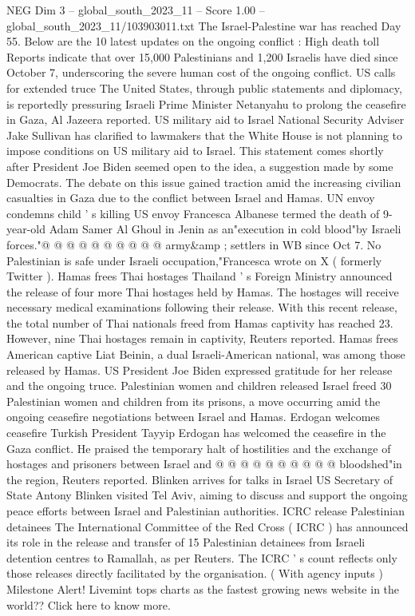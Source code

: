 \begin{textsample}{NEG Dim 3 – global\_south\_2023\_11 – Score 1.00 – global\_south\_2023\_11/103903011.txt}  \label{ex:f3_neg_083}
The Israel-Palestine war has reached Day 55.
Below are the 10 latest updates on the ongoing conflict : High death toll Reports indicate that over 15,000 Palestinians and 1,200 Israelis have died since October 7, underscoring the severe human cost of the ongoing conflict.
US calls for extended truce The United States, through public statements and diplomacy, is reportedly pressuring Israeli Prime Minister Netanyahu to prolong the ceasefire in Gaza, Al Jazeera reported.
US military aid to Israel National Security Adviser Jake Sullivan has clarified to lawmakers that the White House is not planning to impose conditions on US military aid to Israel.
This statement comes shortly after President Joe Biden seemed open to the idea, a suggestion made by some Democrats.
The debate on this issue gained traction amid the increasing civilian casualties in Gaza due to the conflict between Israel and Hamas.
UN envoy condemns child ' s killing US envoy Francesca Albanese termed the death of 9-year-old Adam Samer Al Ghoul in Jenin as an"execution in cold blood"by Israeli forces."@ @ @ @ @ @ @ @ @ @ army\&amp ; settlers in WB since Oct 7.
No Palestinian is safe under Israeli occupation,"Francesca wrote on X ( formerly Twitter ).
Hamas frees Thai hostages Thailand ' s Foreign Ministry announced the release of four more Thai hostages held by Hamas.
The hostages will receive necessary medical examinations following their release.
With this recent release, the total number of Thai nationals freed from Hamas captivity has reached 23.
However, nine Thai hostages remain in captivity, Reuters reported.
Hamas frees American captive Liat Beinin, a dual Israeli-American national, was among those released by Hamas.
US President Joe Biden expressed gratitude for her release and the ongoing truce.
Palestinian women and children released Israel freed 30 Palestinian women and children from its prisons, a move occurring amid the ongoing ceasefire negotiations between Israel and Hamas.
Erdogan welcomes ceasefire Turkish President Tayyip Erdogan has welcomed the ceasefire in the Gaza conflict.
He praised the temporary halt of hostilities and the exchange of hostages and prisoners between Israel and @ @ @ @ @ @ @ @ @ @ bloodshed"in the region, Reuters reported.
Blinken arrives for talks in Israel US Secretary of State Antony Blinken visited Tel Aviv, aiming to discuss and support the ongoing peace efforts between Israel and Palestinian authorities.
ICRC release Palestinian detainees The International Committee of the Red Cross ( ICRC ) has announced its role in the release and transfer of 15 Palestinian detainees from Israeli detention centres to Ramallah, as per Reuters.
The ICRC ' s count reflects only those releases directly facilitated by the organisation. ( With agency inputs ) Milestone Alert!
Livemint tops charts as the fastest growing news website in the world??
Click here to know more.

\end{textsample}
